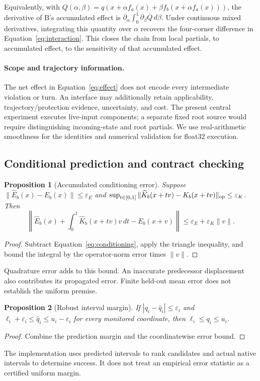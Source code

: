 \documentclass[11pt]{article}
\newtheorem{proposition}{Proposition}
\newcommand{\eps}{\varepsilon}
\begin{document}
Equivalently, with
$Q(\alpha,\beta)=q(x+\alpha f_a(x)+\beta f_b(x+\alpha f_a(x)))$,
the derivative of B's accumulated effect is
$\partial_\alpha\int_0^1\partial_\beta Q\,d\beta$.
Under continuous mixed derivatives, integrating this quantity over $\alpha$
recovers the four-corner difference in Equation~\ref{eq:interaction}.
This closes the chain from local partials, to accumulated effect, to the
sensitivity of that accumulated effect.

\paragraph{Scope and trajectory information.}
The net effect in Equation~\ref{eq:effect} does not encode every intermediate
violation or turn. An interface may additionally retain applicability,
trajectory/protection evidence, uncertainty, and cost. The present central
experiment executes live-input components; a separate fixed root source would
require distinguishing incoming-state and root partials. We use real-arithmetic
smoothness for the identities and numerical validation for float32 execution.

\subsection{Conditional prediction and contract checking}
\begin{proposition}[Accumulated conditioning error]
Suppose $\|\widehat E_b(x)-E_b(x)\|\le\eps_E$ and
$\sup_{t\in[0,1]}\|\widehat K_b(x+tv)-K_b(x+tv)\|_{\rm op}\le\eps_K$.
Then
\[
 \left\|\widehat E_b(x)+\int_0^1\widehat K_b(x+tv)v\,dt-E_b(x+v)\right\|
 \le \eps_E+\eps_K\|v\|.
\]
\end{proposition}
\begin{proof}
Subtract Equation~\ref{eq:conditioning}, apply the triangle inequality,
and bound the integral by the operator-norm error times $\|v\|$.
\end{proof}
Quadrature error adds to this bound. An inaccurate predecessor displacement
also contributes its propagated error. Finite held-out mean error does not
establish the uniform premise.

\begin{proposition}[Robust interval margin]
If $|q_i-\widehat q_i|\le\eps_i$ and
$\ell_i+\eps_i\le\widehat q_i\le u_i-\eps_i$ for every monitored coordinate,
then $\ell_i\le q_i\le u_i$.
\end{proposition}
\begin{proof}
Combine the prediction margin and the coordinatewise error bound.
\end{proof}
The implementation uses predicted intervals to rank candidates and actual
native intervals to determine success. It does not treat an empirical error
statistic as a certified uniform margin.
\end{document}
